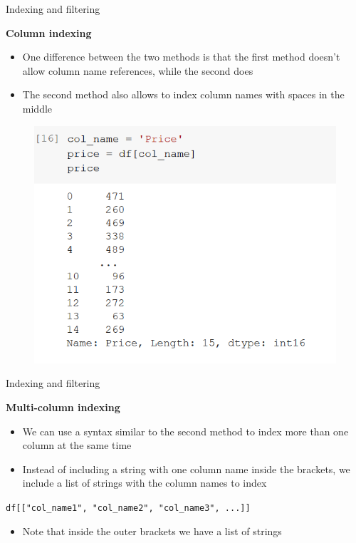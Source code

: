 \documentclass[aspectratio=169]{beamer}
\begin{document}
\begin{frame}{Indexing and filtering}

	\textbf{Column indexing}

	\begin{multicols}{2}

		\begin{itemize}
			\item One difference between the two methods is that the first method doesn't allow column name references, while the second does
			\item The second method also allows to index column names with spaces in the middle
		\end{itemize}

		\begin{figure}
			\centering
			\includegraphics[width=0.9\linewidth]{img/col_name_reference.png}
		\end{figure}

	\end{multicols}

\end{frame}

\begin{frame}{Indexing and filtering}

	\textbf{Multi-column indexing}

	\begin{itemize}
		\item We can use a syntax similar to the second method to index more than one column at the same time
		\item Instead of including a string with one column name inside the brackets, we include a list of strings with the column names to index
	\end{itemize}

	\hspace{7mm} \texttt{df[["col\_name1", "col\_name2", "col\_name3", ...]]}

	\begin{itemize}
		\item Note that inside the outer brackets we have a list of strings
	\end{itemize}

\end{frame}
\end{document}
